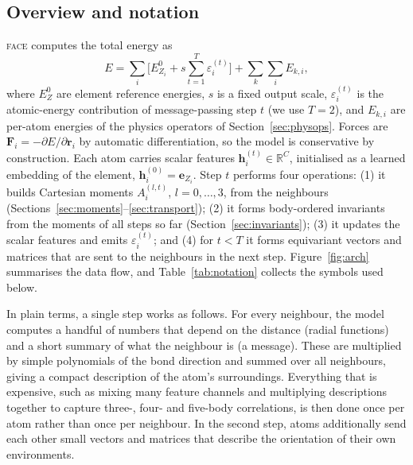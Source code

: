 \documentclass[journal=jctcce,manuscript=article,layout=traditional]{achemso}
\newcommand{\vect}[1]{\bm{#1}}
\newcommand{\FACE}{\textup{\textsc{face}}}
\begin{document}
\subsection{Overview and notation}
\FACE{} computes the total energy as
\begin{equation}
E=\sum_i\Big[E^0_{Z_i}+s\sum_{t=1}^{T}\varepsilon_i^{(t)}\Big]+\sum_k\sum_iE_{k,i},
\label{eq:energy}
\end{equation}
where $E^0_Z$ are element reference energies, $s$ is a fixed output scale, $\varepsilon_i^{(t)}$ is the
atomic-energy contribution of message-passing step $t$ (we use $T=2$), and $E_{k,i}$ are per-atom energies of the
physics operators of Section~\ref{sec:physops}. Forces are $\vect F_i=-\partial E/\partial\vect r_i$ by automatic
differentiation, so the model is conservative by construction. Each atom carries scalar features
$\vect h_i^{(t)}\in\mathbb R^C$, initialised as a learned embedding of the element, $\vect h^{(0)}_i=\vect e_{Z_i}$.
Step $t$ performs four operations: (1) it builds Cartesian moments $A^{(l,t)}_i$, $l=0,\dots,3$, from the neighbours
(Sections~\ref{sec:moments}--\ref{sec:transport}); (2) it forms body-ordered invariants from the moments of all steps
so far (Section~\ref{sec:invariants}); (3) it updates the scalar features and emits $\varepsilon_i^{(t)}$; and (4) for
$t<T$ it forms equivariant vectors and matrices that are sent to the neighbours in the next step. Figure~\ref{fig:arch}
summarises the data flow, and Table~\ref{tab:notation} collects the symbols used below.

In plain terms, a single step works as follows. For every neighbour, the model computes a handful of numbers that
depend on the distance (radial functions) and a short summary of what the neighbour is (a message). These are
multiplied by simple polynomials of the bond direction and summed over all neighbours, giving a compact description
of the atom's surroundings. Everything that is expensive, such as mixing many feature channels and multiplying
descriptions together to capture three-, four- and five-body correlations, is then done once per atom rather than
once per neighbour. In the second step, atoms additionally send each other small vectors and matrices that describe
the orientation of their own environments.
\end{document}
